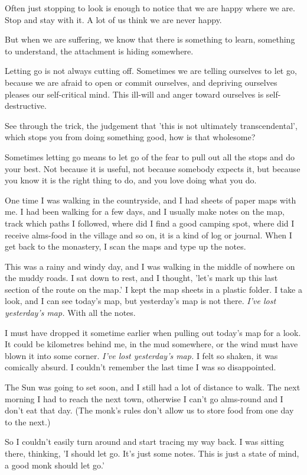 Often just stopping to look is enough to notice that we are happy where
we are. Stop and stay with it. A lot of us think we are never happy.

But when we are suffering, we know that there is something to learn,
something to understand, the attachment is hiding somewhere.

Letting go is not always cutting off. Sometimes we are telling ourselves
to let go, because we are afraid to open or commit ourselves, and
depriving ourselves pleases our self-critical mind. This ill-will and
anger toward ourselves is self-destructive.

See through the trick, the judgement that 'this is not ultimately
transcendental', which stops you from doing something good, how is that
wholesome?

Sometimes letting go means to let go of the fear to pull out all the
stops and do your best. Not because it is useful, not because somebody
expects it, but because you know it is the right thing to do, and you
love doing what you do.

One time I was walking in the countryside, and I had sheets of paper
maps with me. I had been walking for a few days, and I usually make
notes on the map, track which paths I followed, where did I find a good
camping spot, where did I receive alms-food in the village and so on, it
is a kind of log or journal. When I get back to the monastery, I scan
the maps and type up the notes.

This was a rainy and windy day, and I was walking in the middle of
nowhere on the muddy roads. I sat down to rest, and I thought, 'let's
mark up this last section of the route on the map.' I kept the map
sheets in a plastic folder. I take a look, and I can see today's map,
but yesterday's map is not there. \emph{I've lost yesterday's map.} With
all the notes.

I must have dropped it sometime earlier when pulling out today's map for
a look. It could be kilometres behind me, in the mud somewhere, or the
wind must have blown it into some corner. \emph{I've lost yesterday's
map.} I felt so shaken, it was comically absurd. I couldn't remember the
last time I was so disappointed.

The Sun was going to set soon, and I still had a lot of distance to
walk. The next morning I had to reach the next town, otherwise I can't
go alms-round and I don't eat that day. (The monk's rules don't allow us
to store food from one day to the next.)

So I couldn't easily turn around and start tracing my way back. I was
sitting there, thinking, 'I should let go. It's just some notes. This is
just a state of mind, a good monk should let go.'

